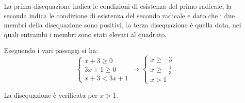\begin{exrig}
\begin{esempio}
La prima disequazione indica le condizioni di esistenza del primo radicale, la seconda indica le condizione di esistenza del secondo radicale e dato che i due membri della disequazione sono positivi, la terza disequazione è quella data, nei quali entrambi i membri sono stati elevati al quadrato.

Eseguendo i vari passaggi si ha: \[\left\{\begin{array}{l}x+3\ge 0\\3x+1\ge 0\\x+3<3x+1\end{array}\right.\Rightarrow \left\{\begin{array}{l}x\ge -3\\x\ge -\frac 1 3\\x>1 \end{array}\right..\]

\begin{center}
 
\end{center}

La disequazione è verificata per $ x>1 $.
\end{esempio}
\end{exrig}

\ovalbox{\risolvii \ref{ese:8.19}, \ref{ese:8.20}, \ref{ese:8.21}, \ref{ese:8.22}, \ref{ese:8.23}, \ref{ese:8.24}, \ref{ese:8.25}, \ref{ese:8.26}}

\newpage

\cleardoublepage
